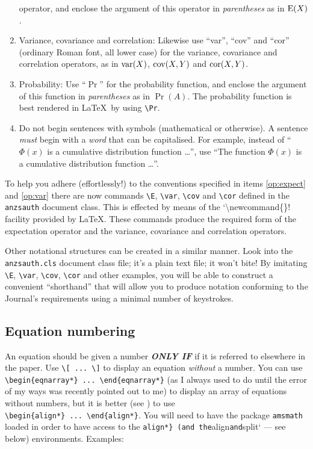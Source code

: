 \documentclass[
  times,
  doublespace]{anzsauth}
\begin{document}
\begin{enumerate}
  operator, and enclose the argument of this operator in
  \emph{parentheses} as in \(\mbox{$\textrm{\textup{E}}$}(X)\). \label{op:expect}
\item
  Variance, covariance and correlation: Likewise use ``var'', ``cov''
  and ``cor'' (ordinary Roman font, all lower case) for the variance,
  covariance and correlation operators, as in \(\mbox{$\textrm{\textup{var}}$}(X)\), \(\mbox{$\textrm{\textup{cov}}$}(X,Y)\)
  and \(\mbox{$\textrm{\textup{cor}}$}(X,Y)\). \label{op:var}
\item
  Probability: Use ``\(\Pr\)'' for the probability function, and enclose
  the argument of this function in \emph{parentheses} as in \(\Pr(A)\).
  The probability function is best rendered in \LaTeX~by using
  \texttt{\textbackslash{}Pr}.
\item
  Do not begin sentences with symbols (mathematical or otherwise). A
  sentence \emph{must} begin with a \emph{word} that can be capitalised.
  For example, instead of ``\(\Phi(x)\) is a cumulative distribution
  function \ldots'', use ``The function \(\Phi(x)\) is a cumulative
  distribution function \ldots''.
\end{enumerate}

To help you adhere (effortlessly!) to the conventions specified in items
\ref{op:expect} and \ref{op:var} there are now commands
\texttt{\textbackslash{}E}, \texttt{\textbackslash{}var},
\texttt{\textbackslash{}cov} and \texttt{\textbackslash{}cor} defined in
the \texttt{anzsauth} document class. This is effected by means of the
`\textbackslash newcommand\{\}! facility provided by \LaTeX. These
commands produce the required form of the expectation operator and the
variance, covariance and correlation operators.

Other notational structures can be created in a similar manner. Look
into the \texttt{anzsauth.cls} document class file; it's a plain text
file; it won't bite! By imitating \texttt{\textbackslash{}E},
\texttt{\textbackslash{}var}, \texttt{\textbackslash{}cov},
\texttt{\textbackslash{}cor} and other examples, you will be able to
construct a convenient ``shorthand'' that will allow you to produce
notation conforming to the Journal's requirements using a minimal number
of keystrokes.

\subsection{Equation numbering}\label{sec-eqnNumb}

An equation should be given a number \textbf{\emph{ONLY IF}} if it is
referred to elsewhere in the paper. Use
\texttt{\textbackslash{}{[}\ ...\ \textbackslash{}{]}} to display an
equation \emph{without} a number. You can use
\texttt{\textbackslash{}begin\{eqnarray*\}\ ...\ \textbackslash{}end\{eqnarray*\}}
(as I always used to do until the error of my ways was recently pointed
out to me) to display an array of equations without numbers, but it is
better (see \citealt{Madsen2006}) to use
\texttt{\textbackslash{}begin\{align*\}\ ...\ \textbackslash{}end\{align*\}}.
You will need to have the package \texttt{amsmath} loaded in order to
have access to the \texttt{align*\}\ (and\ the}align\texttt{and}split`
--- see below) environments. Examples:
\end{document}
